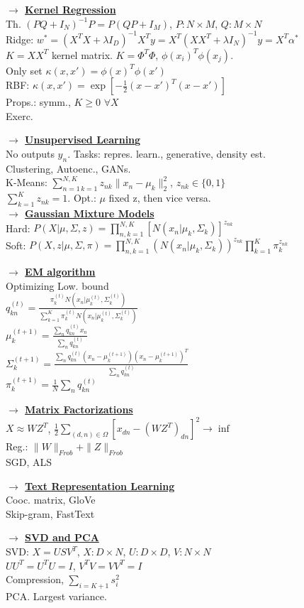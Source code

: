 \documentclass[11pt]{article}
\newcommand{\mytitle}[1]{ {\bf $\rightarrow$ \underline{#1}}\\}
\begin{document}
\begin{multicols*}{2}
\mytitle{Kernel Regression}
Th. $(PQ+I_N)^{-1}P=P(QP+I_M)$, $P\colon N\times M$, $Q\colon M\times N$\\
Ridge: $w^*=(X^TX+\lambda I_D)^{-1}X^Ty=X^T(XX^T+\lambda I_N)^{-1}y=X^T\alpha^*$\\
$K=XX^T$ kernel matrix. $K=\Phi^T\Phi$, $\phi(x_i)^T\phi(x_j)$.\\
Only set $\kappa(x,x')=\phi(x)^T\phi(x')$\\
RBF: $\kappa(x,x')=\exp\left[-\frac{1}{2}(x-x')^T(x-x')\right]$\\
Props.: symm., $K\geqslant 0$ $\forall X$\\
Exerc.

\mytitle{Unsupervised Learning}
No outputs $y_n$. Tasks: repres. learn., generative, density est.\\
Clustering, Autoenc., GANs.\\
K-Means: $\sum\limits_{n=1\,k=1}^{N,K}z_{nk}\|x_n-\mu_k\|_2^2$, $z_{nk}\in\{0,1\}$\\
$\sum\limits_{k=1}^Kz_{nk}=1$. Opt.: $\mu$ fixed z, then vice versa.\\

\mytitle{Gaussian Mixture Models}
Hard: $P(X|\mu,\Sigma,z)=\prod\limits_{n,k=1}^{N,K}\left[N(x_n|\mu_k,\Sigma_k)\right]^{z_{nk}}$\\
Soft: $P(X,z|\mu,\Sigma,\pi)=\prod\limits_{n,k=1}^{N,K}(N(x_n|\mu_k,\Sigma_k))^{z_{nk}}\prod\limits_{k=1}^K\pi_k^{z_{nk}}$

\mytitle{EM algorithm}
Optimizing Low. bound\\
$q_{kn}^{(t)}=\frac{\pi_k^{(t)}N(x_n|\mu_k^{(t)},\Sigma_k^{(t)})}{\sum\limits_{k=1}^K\pi_k^{(t)}N(x_n|\mu_k^{(t)},\Sigma_k^{(t)})}$\\
$\mu_k^{(t+1)}=\frac{\sum_nq_{kn}^{(t)}x_n}{\sum_n q_{kn}^{(t)}}$\\
$\Sigma_k^{(t+1)}=\frac{\sum_nq_{kn}^{(t)}(x_n-\mu_k^{(t+1)})(x_n-\mu_k^{(t+1)})^T}{\sum_nq_{kn}^{(t)}}$\\
$\pi_k^{(t+1)}=\frac{1}{N}\sum_nq_{kn}^{(t)}$

\mytitle{Matrix Factorizations}
$X\approx WZ^T$, $\frac{1}{2}\sum\limits_{(d,n)\in\Omega}\left[x_{dn}-(WZ^T)_{dn}\right]^2\to\inf$\\
Reg.: $\|W\|_{Frob}+\|Z\|_{Frob}$ \\
SGD, ALS


\mytitle{Text Representation Learning}
Cooc. matrix, GloVe\\
Skip-gram, FastText

\mytitle{SVD and PCA}
SVD: $X=USV^T$, $X\colon D\times N$, $U\colon D\times D$, $V\colon N\times N$\\
$UU^T=U^TU=I$, $V^TV=VV^T=I$\\
Compression, $\sum\limits_{i=K+1}s_i^2$\\
PCA. Largest variance.


\end{multicols*}
\end{document}
